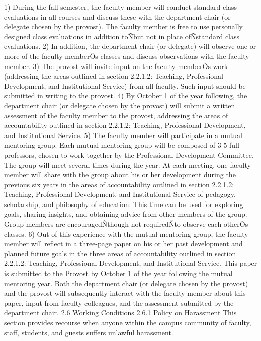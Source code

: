 \documentclass[letterpaper, 11pt]{article}
\begin{document}
1) During the fall semester, the faculty member will conduct standard class evaluations in all courses and discuss these with the department chair (or delegate chosen by the provost). The faculty member is free to use personally designed class evaluations in addition toÑbut not in place ofÑstandard class evaluations. 
2) In addition, the department chair (or delegate) will observe one or more of the faculty memberÕs classes and discuss observations with the faculty member. 
3) The provost will invite input on the faculty memberÕs work (addressing the areas outlined in section 2.2.1.2: Teaching, Professional Development, and Institutional Service) from all faculty. Such input should be submitted in writing to the provost. 
4) By October 1 of the year following, the department chair (or delegate chosen by the provost) will submit a written assessment of the faculty member to the provost, addressing the areas of accountability outlined in section 2.2.1.2: Teaching, Professional Development, and Institutional Service. 
5) The faculty member will participate in a mutual mentoring group. Each mutual mentoring group will be composed of 3-5 full professors, chosen to work together by the Professional Development Committee. The group will meet several times during the year. At each meeting, one faculty member will share with the group about his or her development during the previous six years in the areas of accountability outlined in section 2.2.1.2: Teaching, Professional Development, and Institutional Service of pedagogy, scholarship, and philosophy of education. This time can be used for exploring goals, sharing insights, and obtaining advice from other members of the group. Group members are encouragedÑthough not requiredÑto observe each otherÕs classes. 
6) Out of this experience with the mutual mentoring group, the faculty member will reflect in a three-page paper on his or her past development and planned future goals in the three areas of accountability outlined in section 2.2.1.2: Teaching, Professional Development, and Institutional Service. This paper is submitted to the Provost by October 1 of the year following the mutual mentoring year. Both the department chair (or delegate chosen by the provost) and the provost will subsequently interact with the faculty member about this paper, input from faculty colleagues, and the assessment submitted by the department chair. 
2.6 Working Conditions
2.6.1 Policy on Harassment
   This section provides recourse when anyone within the campus community of faculty, staff, students, and guests suffers unlawful harassment.
\end{document}
